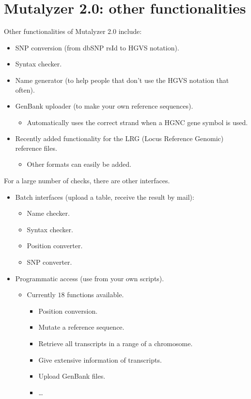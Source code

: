 \documentclass[slidestop]{beamer}
\begin{document}
\section{Mutalyzer 2.0: other functionalities}
\begin{frame}
  Other functionalities of Mutalyzer 2.0 include:
  \begin{itemize}
    \pause
    \item SNP conversion (from dbSNP rsId to HGVS notation).
    \pause
    \item Syntax checker.
    \pause
    \item Name generator (to help people that don't use the HGVS notation that
          often).
    \pause
    \item GenBank uploader (to make your own reference sequences).
    \begin{itemize}
      \item Automatically uses the correct strand when a HGNC gene symbol is
            used.
    \end{itemize}
    \pause
    \item Recently added functionality for the LRG (Locus Reference Genomic)
          reference files.
    \begin{itemize}
      \item Other formats can easily be added.
    \end{itemize}
  \end{itemize}
\end{frame}

\begin{frame}
  For a large number of checks, there are other interfaces.
  \bigskip
  \begin{itemize}
    \pause
    \item Batch interfaces (upload a table, receive the result by mail):
    \begin{itemize}
      \item Name checker.
      \item Syntax checker.
      \item Position converter.
      \item SNP converter.
    \end{itemize}
    \pause
    \item Programmatic access (use from your own scripts).
    \begin{itemize}
      \item Currently $18$ functions available.
      \begin{itemize}
        \item Position conversion.
        \item Mutate a reference sequence.
        \item Retrieve all transcripts in a range of a chromosome.
        \item Give extensive information of transcripts.
        \item Upload GenBank files.
        \item \ldots
      \end{itemize}
    \end{itemize}
  \end{itemize}
\end{frame}
\end{document}
